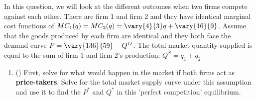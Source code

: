 \begin{question}[type=exam]{30}
  In this question, we will look at the different outcomes when two firms compete against each other.
  There are firm 1 and firm 2 and they have identical marginal cost functions of
  $MC_1(q)=MC_2(q)=\vary{4}{3}q + \vary{16}{9}$.
  Assume that the goods produced by each firm are identical and they both face the demand curve
  $P=\vary{136}{59} - Q^D$.
  The total market quantity supplied is equal to the sum of firm 1 and firm 2's production:
  $Q^S = q_1+q_2$

  \begin{enumerate}[label=(\alph*)]

    \item ()
    First, solve for what would happen in the market if both firms act as \textbf{price-takers}.
    Solve for the total market supply curve under this assumption and use it to find the $P^*$ and $Q^*$ in this 'perfect competition' equilibrium.

    

\end{enumerate}
\end{question}
